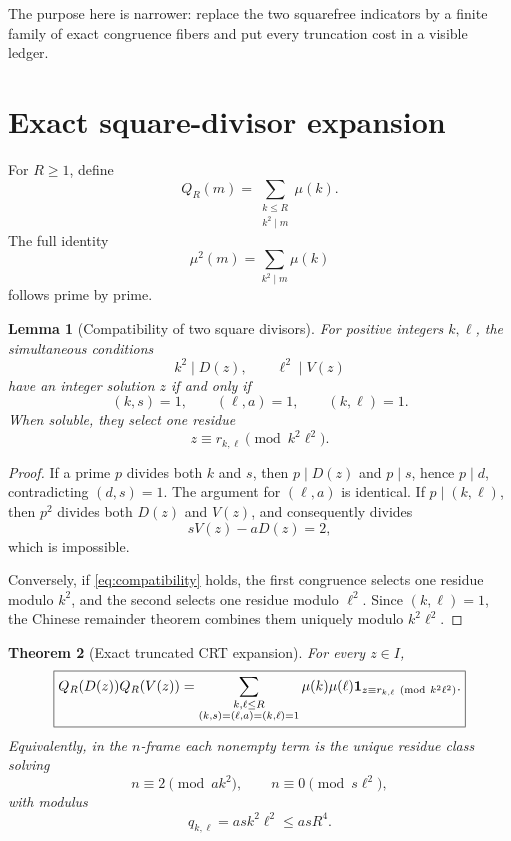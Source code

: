 \documentclass[11pt]{article}
\newtheorem{theorem}{Theorem}[section]
\newtheorem{lemma}[theorem]{Lemma}
\theoremstyle{definition}
\theoremstyle{remark}
\newcommand{\one}{\mathbf 1}
\begin{document}
The purpose here is narrower: replace the two squarefree indicators
by a finite family of exact congruence fibers and put every
truncation cost in a visible ledger.

\section{Exact square-divisor expansion}

For \(R\ge1\), define
\begin{equation}
 Q_R(m)=\sum_{\substack{k\le R\\k^2\mid m}}\mu(k).
\label{eq:QR}
\end{equation}
The full identity
\begin{equation}
 \mu^2(m)=\sum_{k^2\mid m}\mu(k)
\label{eq:squarefree-identity}
\end{equation}
follows prime by prime.

\begin{lemma}[Compatibility of two square divisors]
\label{lem:compatibility}
For positive integers \(k,\ell\), the simultaneous conditions
\[
 k^2\mid D(z),\qquad \ell^2\mid V(z)
\]
have an integer solution \(z\) if and only if
\begin{equation}
 (k,s)=1,\qquad(\ell,a)=1,\qquad(k,\ell)=1.
\label{eq:compatibility}
\end{equation}
When soluble, they select one residue
\[
 z\equiv r_{k,\ell}\pmod{k^2\ell^2}.
\]
\end{lemma}

\begin{proof}
If a prime \(p\) divides both \(k\) and \(s\), then
\(p\mid D(z)\) and \(p\mid s\), hence \(p\mid d\), contradicting
\((d,s)=1\).  The argument for \((\ell,a)\) is identical.  If
\(p\mid(k,\ell)\), then \(p^2\) divides both \(D(z)\) and \(V(z)\),
and consequently divides
\[
 sV(z)-aD(z)=2,
\]
which is impossible.

Conversely, if \eqref{eq:compatibility} holds, the first congruence
selects one residue modulo \(k^2\), and the second selects one
residue modulo \(\ell^2\).  Since \((k,\ell)=1\), the Chinese
remainder theorem combines them uniquely modulo \(k^2\ell^2\).
\end{proof}

\begin{theorem}[Exact truncated CRT expansion]
\label{thm:crt-expansion}
For every \(z\in I\),
\begin{equation}
\boxed{
 Q_R(D(z))Q_R(V(z))
 =
 \sum_{\substack{k,\ell\le R\\
 (k,s)=(\ell,a)=(k,\ell)=1}}
 \mu(k)\mu(\ell)
 \one_{z\equiv r_{k,\ell}\ ({\rm mod}\ k^2\ell^2)}.}
\label{eq:crt-z}
\end{equation}
Equivalently, in the \(n\)-frame each nonempty term is the unique
residue class solving
\begin{equation}
 n\equiv2\pmod{ak^2},\qquad
 n\equiv0\pmod{s\ell^2},
\label{eq:crt-n}
\end{equation}
with modulus
\begin{equation}
 q_{k,\ell}=ask^2\ell^2\le asR^4.
\label{eq:modulus-inflation}
\end{equation}
\end{theorem}
\end{document}

